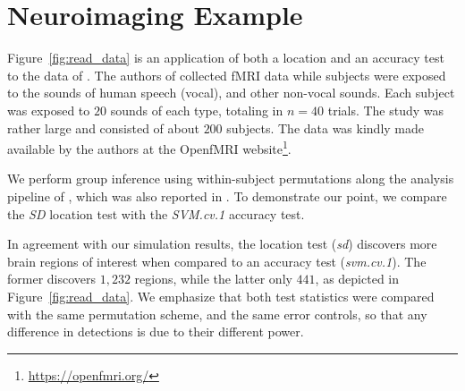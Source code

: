 \documentclass[12pt,a4paper]{article}
\begin{document}
\section{Neuroimaging Example}
\label{sec:example}

Figure~\ref{fig:read_data} is an application of both a location and an accuracy test to the data of \cite{pernet_human_2015}. 
The authors of \cite{pernet_human_2015} collected fMRI data while subjects were exposed to the sounds of human speech (vocal), and other non-vocal sounds. 
Each subject was exposed to $20$ sounds of each type, totaling in $n=40$ trials.
The study was rather large and consisted of about $200$ subjects.
The data was kindly made available by the authors at the OpenfMRI website\footnote{\url{https://openfmri.org/}}.

We perform group inference using within-subject permutations along the analysis pipeline of \cite{stelzer_statistical_2013}, which was also reported in \cite{gilron_quantifying_2016}. 
To demonstrate our point, we compare the \emph{SD} location test with the \emph{SVM.cv.1} accuracy test. 

In agreement with our simulation results, the location test (\emph{sd}) discovers more brain regions of interest when compared to an accuracy test (\emph{svm.cv.1}).
The former discovers $1,232$ regions, while the latter only $441$, as depicted in Figure~\ref{fig:read_data}.
We emphasize that both test statistics were compared with the same permutation scheme, and the same error controls, so that any difference in detections is due to their different power.
\end{document}
